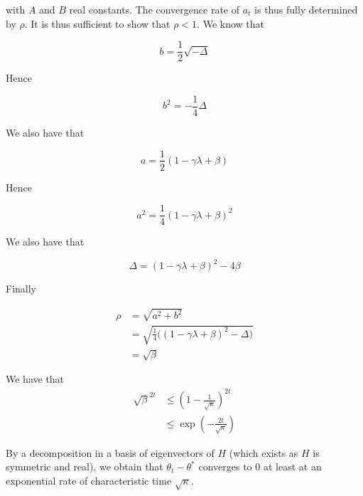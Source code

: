 \documentclass[
10pt, %
a4paper, %
oneside, %
headinclude,footinclude, %
BCOR5mm, %
]{scrartcl}
\begin{document}
with $A$ and $B$ real constants. The convergence rate of $a_t$ is thus fully determined by $\rho$. It is thus sufficient to show that $\rho<1$. We know that

\begin{equation}
b= \frac{1}{2} \sqrt{- \Delta}
\end{equation}

Hence

\begin{equation}
    b^2 = -\frac{1}{4} \Delta
\end{equation}

We also have that

\begin{equation}
    a= \frac{1}{2} (1- \gamma\lambda + \beta)
\end{equation}

Hence

\begin{equation}
    a^2 = \frac{1}{4} (1- \gamma\lambda + \beta)^2
\end{equation}

We also have that

\begin{equation}
    \Delta = (1- \gamma\lambda + \beta)^2-4\beta
\end{equation}

Finally

\begin{equation}
    \begin{aligned}
        \label{eq:}
	\rho &=  \sqrt{a^2+b^2}\\
	&= \sqrt{\frac{1}{4} \Big( (1- \gamma\lambda +\beta)^2-\Delta \Big)}\\
	&=  \sqrt{\beta}
    \end{aligned}
\end{equation}

\exercice{}

We have that 
\begin{equation}
	\begin{aligned}
		\label{eq:}
		\sqrt{\beta}^{2t} &\leq (1- \frac{1}{\sqrt{\kappa}})^{2t}\\
		&\leq \exp(- \frac{2t}{\sqrt{\kappa}})
	\end{aligned}
\end{equation}

By a decomposition in a basis of eigenvectors of $H$ (which exists as $H$ is symmetric and real), we obtain that $\theta_t-\theta^*$ converges to $0$ at least at an exponential rate of characteristic time $\sqrt{\kappa}$.
\end{document}
